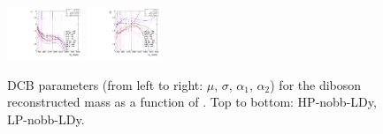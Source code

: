 \begin{figure}[htbp]
  \includegraphics[width=0.2\textwidth]{fig/2Dfit/paramSignalShape_allSig_MVV_LP_nobb_LDy_ALPHA1.pdf}
  \includegraphics[width=0.2\textwidth]{fig/2Dfit/paramSignalShape_allSig_MVV_LP_nobb_LDy_ALPHA2.pdf}\\
  \caption{
    DCB parameters (from left to right: $\mu$, $\sigma$, $\alpha_1$, $\alpha_2$) for the diboson reconstructed mass \MVV as a function of \MX.
    Top to bottom: HP-nobb-LDy, LP-nobb-LDy.
  }
  \label{fig:MVVShapeParam_LDy_Run2}
\end{figure}

